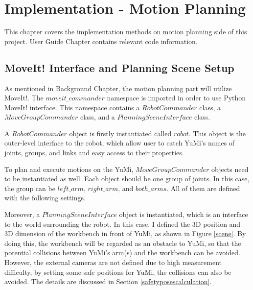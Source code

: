 \chapter{Implementation - Motion Planning}

This chapter covers the implementation methods on motion planning side of this project. User Guide Chapter contains relevant code information.

\section{MoveIt! Interface and Planning Scene Setup} \label{motionplansetup}
As mentioned in Background Chapter, the motion planning part will utilize MoveIt!. The $moveit\_commander$ namespace is imported in order to use Python MoveIt! interface. This namespace contains a $RobotCommander$ class, a $MoveGroupCommander$ class, and a $PlanningSceneInterface$ class.

A $RobotCommander$ object is firstly instantiated called $robot$. This object is the outer-level interface to the robot, which allow user to catch YuMi's names of joints, groups, and links and easy access to their properties.

To plan and execute motions on the YuMi, $MoveGroupCommander$ objects need to be instantiated as well. Each object should be one group of joints. In this case, the group can be $left\_arm$, $right\_arm$, and $both\_arms$. All of them are defined with the following settings.

\begin{table}[H]
\centering
{}
\caption{Settings of three $MoveGroupCommander$ objects}
\label{armsetup}
\end{table}

Moreover, a $PlanningSceneInterface$ object is instantiated, which is an interface to the world surrounding the robot. In this case, I defined the 3D position and 3D dimension of the workbench in front of YuMi, as shown in Figure \ref{scene}. By doing this, the workbench will be regarded as an obstacle to YuMi, so that the potential collisions between YuMi's arm(s) and the workbench can be avoided. However, the external cameras are not defined due to high measurement difficulty, by setting some safe positions for YuMi, the collisions can also be avoided. The details are discussed in Section \ref{safetyposescalculation}.


